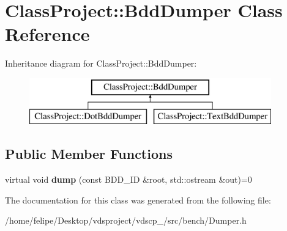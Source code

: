 \section{Class\+Project\+:\+:Bdd\+Dumper Class Reference}
\label{classClassProject_1_1BddDumper}
Inheritance diagram for Class\+Project\+:\+:Bdd\+Dumper\+:\begin{figure}[H]
\begin{center}
\leavevmode
\includegraphics[height=2.000000cm]{classClassProject_1_1BddDumper}
\end{center}
\end{figure}
\subsection*{Public Member Functions}
\begin{DoxyCompactItemize}
\item 
virtual void {\bfseries dump} (const B\+D\+D\+\_\+\+ID \&root, std\+::ostream \&out)=0\label{classClassProject_1_1BddDumper_ae0183004c7f247c8cbc6491de1de5507}

\end{DoxyCompactItemize}


The documentation for this class was generated from the following file\+:\begin{DoxyCompactItemize}
\item 
/home/felipe/\+Desktop/vdsproject/vdscp\+\_/src/bench/Dumper.\+h\end{DoxyCompactItemize}
